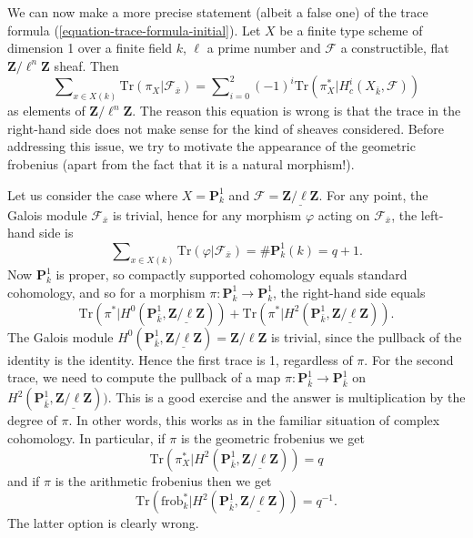 \noindent
We can now make a more precise statement (albeit a false one) of the trace
formula (\ref{equation-trace-formula-initial}). Let $X$ be a finite
type scheme of dimension 1
over a finite field $k$, $\ell$ a prime number and $\mathcal{F}$ a
constructible, flat $\mathbf{Z}/\ell^n\mathbf{Z}$ sheaf. Then
\begin{equation}
\label{equation-trace-formula-second}
\sum\nolimits_{x \in X(k)}
\text{Tr}(\pi_X | \mathcal{F}_{\bar x})
=
\sum\nolimits_{i=0}^2
(-1)^i \text{Tr}(\pi_X^* | H^i_c(X_{\bar k}, \mathcal{F}))
\end{equation}
as elements of $\mathbf{Z}/\ell^n\mathbf{Z}$. The reason this equation is wrong
is that the trace in the right-hand side does not make sense for the kind of
sheaves considered. Before addressing this issue, we try to motivate the
appearance of the geometric frobenius (apart from the fact that it is a natural
morphism!).

\medskip\noindent
Let us consider the case where $X = \mathbf{P}^1_k$ and $\mathcal{F} =
\underline{\mathbf{Z}/\ell\mathbf{Z}}$. For any point, the Galois module
$\mathcal{F}_{\bar x}$ is trivial, hence for any morphism $\varphi$ acting on
$\mathcal{F}_{\bar x}$, the left-hand side is
$$
\sum\nolimits_{x \in X(k)} \text{Tr}(\varphi | \mathcal{F}_{\bar x}) =
\#\mathbf{P}^1_k(k) = q+1.
$$
Now $\mathbf{P}^1_k$ is proper, so compactly supported cohomology equals
standard cohomology, and so for a morphism $\pi : \mathbf{P}^1_k \to
\mathbf{P}^1_k$, the right-hand side equals
$$
\text{Tr}(\pi^* | H^0 (\mathbf{P}^1_{\bar k},
\underline{\mathbf{Z}/\ell\mathbf{Z}})) + \text{Tr}(\pi^* | H^2
(\mathbf{P}^1_{\bar k}, \underline{\mathbf{Z}/\ell\mathbf{Z}})).
$$
The Galois module $H^0 (\mathbf{P}^1_{\bar k},
\underline{\mathbf{Z}/\ell\mathbf{Z}}) = \mathbf{Z}/\ell\mathbf{Z}$ is trivial,
since the pullback of the identity is the identity. Hence the first trace is 1,
regardless of $\pi$. For the second trace, we need to compute the pullback of a
map $\pi: \mathbf{P}^1_{\bar k} \to \mathbf{P}^1_{\bar k}$ on $H^2
(\mathbf{P}^1_{\bar k}, \underline{\mathbf{Z}/\ell\mathbf{Z}}))$. This is a
good exercise and the answer is multiplication by the degree of $\pi$. In other
words, this works as in the familiar situation of complex cohomology. In
particular, if $\pi$ is the geometric frobenius we get
$$
\text{Tr}(\pi_X^* | H^2 (\mathbf{P}^1_{\bar k},
\underline{\mathbf{Z}/\ell\mathbf{Z}})) = q
$$
and if $\pi$ is the arithmetic frobenius then we get
$$
\text{Tr}(\text{frob}_k^* | H^2 (\mathbf{P}^1_{\bar k},
\underline{\mathbf{Z}/\ell\mathbf{Z}})) = q^{-1}.
$$
The latter option is clearly wrong.

